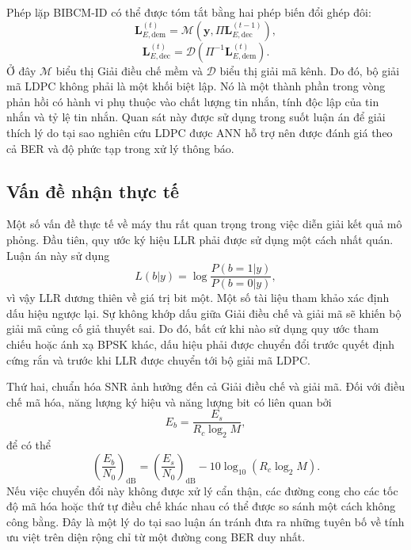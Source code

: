 Phép lặp BIBCM-ID có thể được tóm tắt bằng hai phép biến đổi ghép đôi:
\begin{equation}
  \mathbf{L}_{E,\mathrm{dem}}^{(t)}
  =
  \mathcal{M}\left(\mathbf{y},\Pi\mathbf{L}_{E,\mathrm{dec}}^{(t-1)}\right),
\end{equation}
\begin{equation}
  \mathbf{L}_{E,\mathrm{dec}}^{(t)}
  =
  \mathcal{D}\left(\Pi^{-1}\mathbf{L}_{E,\mathrm{dem}}^{(t)}\right).
\end{equation}
Ở đây $\mathcal{M}$ biểu thị Giải điều chế mềm và $\mathcal{D}$ biểu thị giải mã kênh. Do đó, bộ giải mã LDPC không phải là một khối biệt lập. Nó là một thành phần trong vòng phản hồi có hành vi phụ thuộc vào chất lượng tin nhắn, tính độc lập của tin nhắn và tỷ lệ tin nhắn. Quan sát này được sử dụng trong suốt luận án để giải thích lý do tại sao nghiên cứu LDPC được ANN hỗ trợ nên được đánh giá theo cả BER và độ phức tạp trong xử lý thông báo.

\subsection{Vấn đề nhận thực tế}
Một số vấn đề thực tế về máy thu rất quan trọng trong việc diễn giải kết quả mô phỏng. Đầu tiên, quy ước ký hiệu LLR phải được sử dụng một cách nhất quán. Luận án này sử dụng
\begin{equation}
  L(b|y)=\log\frac{P(b=1|y)}{P(b=0|y)},
\end{equation}
vì vậy LLR dương thiên về giá trị bit một. Một số tài liệu tham khảo xác định dấu hiệu ngược lại. Sự không khớp dấu giữa Giải điều chế và giải mã sẽ khiến bộ giải mã củng cố giả thuyết sai. Do đó, bất cứ khi nào sử dụng quy ước tham chiếu hoặc ánh xạ BPSK khác, dấu hiệu phải được chuyển đổi trước quyết định cứng rắn và trước khi LLR được chuyển tới bộ giải mã LDPC.

Thứ hai, chuẩn hóa SNR ảnh hưởng đến cả Giải điều chế và giải mã. Đối với điều chế mã hóa, năng lượng ký hiệu và năng lượng bit có liên quan bởi
\begin{equation}
  E_b=\frac{E_s}{R_c\log_2 M},
\end{equation}
để có thể
\begin{equation}
  \left(\frac{E_b}{N_0}\right)_{\mathrm{dB}}
  =
  \left(\frac{E_s}{N_0}\right)_{\mathrm{dB}}
  -
  10\log_{10}(R_c\log_2 M).
\end{equation}
Nếu việc chuyển đổi này không được xử lý cẩn thận, các đường cong cho các tốc độ mã hóa hoặc thứ tự điều chế khác nhau có thể được so sánh một cách không công bằng. Đây là một lý do tại sao luận án tránh đưa ra những tuyên bố về tính ưu việt trên diện rộng chỉ từ một đường cong BER duy nhất.

